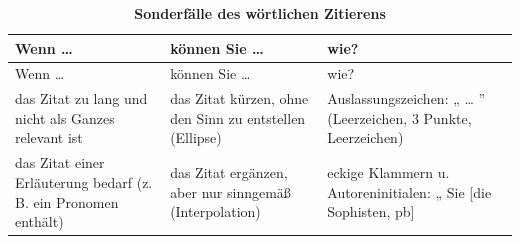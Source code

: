 \documentclass[]{book}
\theoremstyle{definition}
\theoremstyle{definition}
\theoremstyle{definition}
\theoremstyle{remark}
\begin{document}
\begin{longtable}[]{@{}lll@{}}
\caption{\textbf{\label{tab:zitieren3} Sonderfälle des wörtlichen
Zitierens}}\tabularnewline
\toprule
\begin{minipage}[b]{0.13\columnwidth}\raggedright\strut
Wenn \ldots{}\strut
\end{minipage} & \begin{minipage}[b]{0.41\columnwidth}\raggedright\strut
können Sie \ldots{}\strut
\end{minipage} & \begin{minipage}[b]{0.38\columnwidth}\raggedright\strut
wie?\strut
\end{minipage}\tabularnewline
\midrule
\endfirsthead
\toprule
\begin{minipage}[b]{0.13\columnwidth}\raggedright\strut
Wenn \ldots{}\strut
\end{minipage} & \begin{minipage}[b]{0.41\columnwidth}\raggedright\strut
können Sie \ldots{}\strut
\end{minipage} & \begin{minipage}[b]{0.38\columnwidth}\raggedright\strut
wie?\strut
\end{minipage}\tabularnewline
\midrule
\endhead
\begin{minipage}[t]{0.13\columnwidth}\raggedright\strut
das Zitat zu lang und nicht als Ganzes relevant ist\strut
\end{minipage} & \begin{minipage}[t]{0.41\columnwidth}\raggedright\strut
das Zitat kürzen, ohne den Sinn zu entstellen (Ellipse)\strut
\end{minipage} & \begin{minipage}[t]{0.38\columnwidth}\raggedright\strut
Auslassungszeichen: „ \ldots{} '' (Leerzeichen, 3 Punkte, Leerzeichen)
\vspace{-6mm}\strut
\end{minipage}\tabularnewline
\begin{minipage}[t]{0.13\columnwidth}\raggedright\strut
das Zitat einer Erläuterung bedarf (z. B. ein Pronomen enthält)\strut
\end{minipage} & \begin{minipage}[t]{0.41\columnwidth}\raggedright\strut
das Zitat ergänzen, aber nur sinngemäß (Interpolation)\strut
\end{minipage} & \begin{minipage}[t]{0.38\columnwidth}\raggedright\strut
eckige Klammern u. Autoreninitialen: „ Sie {[}die Sophisten, pb{]}

\end{minipage}
\end{longtable}
\end{document}
